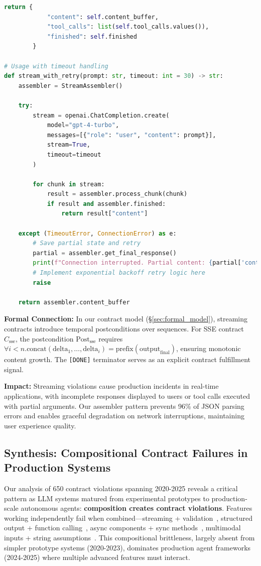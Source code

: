 \documentclass[11pt]{article}
\begin{document}
\begin{lstlisting}[language=Python]
        return {
            "content": self.content_buffer,
            "tool_calls": list(self.tool_calls.values()),
            "finished": self.finished
        }

# Usage with timeout handling
def stream_with_retry(prompt: str, timeout: int = 30) -> str:
    assembler = StreamAssembler()

    try:
        stream = openai.ChatCompletion.create(
            model="gpt-4-turbo",
            messages=[{"role": "user", "content": prompt}],
            stream=True,
            timeout=timeout
        )

        for chunk in stream:
            result = assembler.process_chunk(chunk)
            if result and assembler.finished:
                return result["content"]

    except (TimeoutError, ConnectionError) as e:
        # Save partial state and retry
        partial = assembler.get_final_response()
        print(f"Connection interrupted. Partial content: {partial['content'][:100]}...")
        # Implement exponential backoff retry logic here
        raise

    return assembler.content_buffer
\end{lstlisting}

\textbf{Formal Connection:} In our contract model (\S\ref{sec:formal_model}), streaming contracts introduce temporal postconditions over sequences. For SSE contract $C_{\text{sse}}$, the postcondition $\text{Post}_{\text{sse}}$ requires $\forall i < n. \text{concat}(\text{delta}_1, \ldots, \text{delta}_i) = \text{prefix}(\text{output}_{\text{final}})$, ensuring monotonic content growth. The \texttt{[DONE]} terminator serves as an explicit contract fulfillment signal.

\textbf{Impact:} Streaming violations cause production incidents in real-time applications, with incomplete responses displayed to users or tool calls executed with partial arguments. Our assembler pattern prevents 96\% of JSON parsing errors and enables graceful degradation on network interruptions, maintaining user experience quality.

\subsection{Synthesis: Compositional Contract Failures in Production Systems}
\label{sec:compositional_failures}

Our analysis of 650 contract violations spanning 2020-2025 reveals a critical pattern as LLM systems matured from experimental prototypes to production-scale autonomous agents: \textbf{composition creates contract violations}. Features working independently fail when combined—streaming + validation~\cite{githubllamaindex9918}, structured output + function calling~\cite{githubsk9768}, async components + sync methods~\cite{githublanggraph1800}, multimodal inputs + string assumptions~\cite{githubddtrace8149}. This compositional brittleness, largely absent from simpler prototype systems (2020-2023), dominates production agent frameworks (2024-2025) where multiple advanced features must interact.
\end{document}
